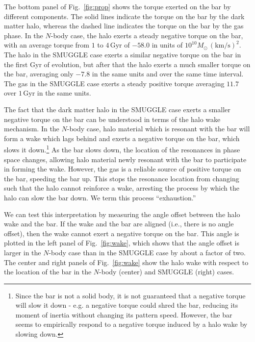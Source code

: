 \documentclass{natureprintstyle}
\newcommand{\Nbody}{$N$-body}
\begin{document}
The bottom panel of Fig.~\ref{fig:prop} shows the torque exerted on the bar by
different components. The solid lines indicate the torque on the bar by the
dark matter halo, whereas the dashed line indicates the torque on the bar by
the gas phase. In the \Nbody{} case, the halo exerts a steady negative torque on
the bar, with an average torque from $1$ to $4\,\textrm{Gyr}$ of $-58.0$ in
units of $10^{10}M_{\odot}\,(\textrm{km}/\textrm{s})^2$. The halo in the
SMUGGLE case exerts a similar negative torque on the bar in the first Gyr of
evolution, but after that the halo exerts a much smaller torque on the bar,
averaging only $-7.8$ in the same units and over the same time interval. The gas in
the SMUGGLE case exerts a steady positive torque averaging $11.7$ over $1\,\textrm{Gyr}$ in the same
units.

The fact that the dark matter halo in the SMUGGLE case exerts a smaller
negative torque on the bar can be understood in terms of the halo wake
mechanism. In the \Nbody{} case, halo material which is resonant with the bar
will form a wake which lags behind and exerts a negative torque on the bar,
which slows it down.\cite{1984MNRAS.209..729T, 1985MNRAS.213..451W,
1992ApJ...400...80H}\footnote{Since the bar is not a solid body, it is not
guaranteed that a negative torque will slow it down - e.g. a negative torque
could shred the bar, reducing its moment of inertia without changing its
pattern speed. However, the bar seems to empirically respond to a negative
torque induced by a halo wake by slowing down.} As the bar slows down, the
location of the resonances in phase space changes, allowing halo material
newly resonant with the bar to participate in forming the wake. However, the
gas is a reliable source of positive torque on the bar, speeding the bar up.
This stops the resonance location from changing such that the halo cannot
reinforce a wake, arresting the process by which the halo can slow the bar
down. We term this process ``exhaustion.''

We can test this interpretation by measuring the angle offset between the halo
wake and the bar. If the wake and the bar are aligned (i.e., there is no angle
offset), then the wake cannot exert a negative torque on the bar. This angle
is plotted in the left panel of Fig.~\ref{fig:wake}, which shows that the
angle offset is larger in the \Nbody{} case than in the SMUGGLE case by about a
factor of two. The center and right panels of Fig.~\ref{fig:wake} show the halo
wake with respect to the location of the bar in the \Nbody{} (center) and SMUGGLE
(right) cases.
\end{document}
